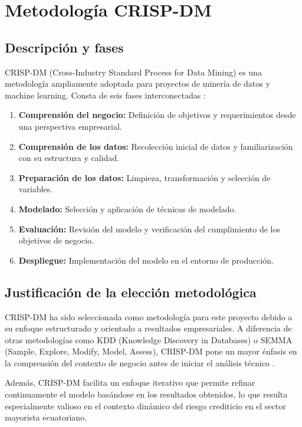\section{Metodología CRISP-DM}
\subsection{Descripción y fases}
CRISP-DM (Cross-Industry Standard Process for Data Mining) es una metodología ampliamente adoptada para proyectos de minería de datos y machine learning. Consta de seis fases interconectadas \cite{hernandez2020metodologia}:

\begin{enumerate}
    \item \textbf{Comprensión del negocio:} Definición de objetivos y requerimientos desde una perspectiva empresarial.
    \item \textbf{Comprensión de los datos:} Recolección inicial de datos y familiarización con su estructura y calidad.
    \item \textbf{Preparación de los datos:} Limpieza, transformación y selección de variables.
    \item \textbf{Modelado:} Selección y aplicación de técnicas de modelado.
    \item \textbf{Evaluación:} Revisión del modelo y verificación del cumplimiento de los objetivos de negocio.
    \item \textbf{Despliegue:} Implementación del modelo en el entorno de producción.
\end{enumerate}

\subsection{Justificación de la elección metodológica}
CRISP-DM ha sido seleccionada como metodología para este proyecto debido a su enfoque estructurado y orientado a resultados empresariales. A diferencia de otras metodologías como KDD (Knowledge Discovery in Databases) o SEMMA (Sample, Explore, Modify, Model, Assess), CRISP-DM pone un mayor énfasis en la comprensión del contexto de negocio antes de iniciar el análisis técnico \cite{hernandez2020metodologia}.

Además, CRISP-DM facilita un enfoque iterativo que permite refinar continuamente el modelo basándose en los resultados obtenidos, lo que resulta especialmente valioso en el contexto dinámico del riesgo crediticio en el sector mayorista ecuatoriano.

